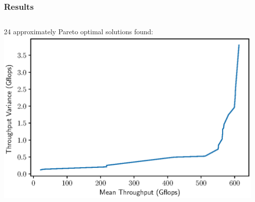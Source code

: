 \documentclass[aspectratio=169]{beamer}
\begin{document}
\begin{frame}\frametitle{Results}
	\begin{columns}
		\begin{column}{0.4\textwidth}
			24 approximately Pareto optimal solutions found:\\
			\includegraphics[width=1.1\textwidth]{hpl_n10k_pf.eps}

			\medskip


\end{column}
\end{columns}
\end{frame}
\end{document}

